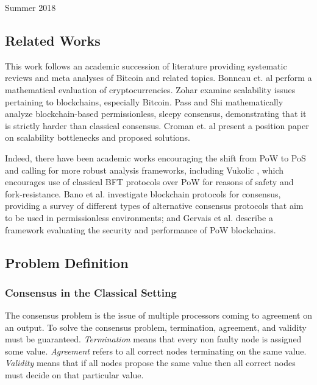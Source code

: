 \documentclass[10pt,journal,compsoc]{IEEEtran}
\begin{document}
\hfill 
 
\hfill Summer 2018


\subsection{Related Works} \label{related}
This work follows an academic succession of literature providing systematic reviews and meta analyses of Bitcoin and related topics. Bonneau et. al \cite{Bonneau} perform a mathematical evaluation of cryptocurrencies. Zohar \cite{Zohar} examine scalability issues pertaining to blockchains, especially Bitcoin. Pass and Shi \cite{Rethinking} mathematically analyze blockchain-based permissionless, sleepy consensus, demonstrating that it is strictly harder than classical consensus. Croman et. al \cite{CromanEtAl} present a position paper on scalability bottlenecks and proposed solutions. 

Indeed, there have been academic works encouraging the shift from PoW to PoS and calling for more robust analysis frameworks, including Vukolic \cite{Vukolic}, which encourages use of classical BFT protocols over PoW for reasons of safety and fork-resistance. %
Bano et al. \cite{Bano} investigate blockchain  protocols for consensus, providing a survey of different types of alternative consensus protocols that aim to be used in permissionless environments; and Gervais et al. \cite{Gervais} describe a framework evaluating the security and performance of PoW blockchains.


\subsection{Problem Definition}

  
\subsubsection{Consensus in the Classical Setting}

The consensus problem is the issue of multiple processors coming to agreement on an output.\cite{AttiyaWelch} To solve the consensus problem, termination, agreement, and validity must be guaranteed. \emph{Termination} means that every non faulty node is assigned some value. \emph{Agreement} refers to all correct nodes terminating on the same value. \emph{Validity} means that if all nodes propose the same value then all correct nodes must decide on that particular value. %
\end{document}
